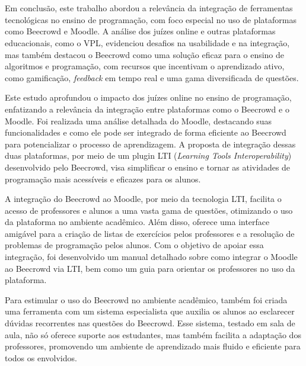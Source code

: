 

\chapter{}

Em conclusão, este trabalho abordou a relevância da integração de ferramentas tecnológicas no ensino de programação, com foco especial no uso de plataformas como Beecrowd e Moodle. A análise dos juízes online e outras plataformas educacionais, como o VPL, evidenciou desafios na usabilidade e na integração, mas também destacou o Beecrowd como uma solução eficaz para o ensino de algoritmos e programação, com recursos que incentivam o aprendizado ativo, como gamificação, \textit{feedback} em tempo real e uma gama diversificada de questões.

Este estudo aprofundou o impacto dos juízes online no ensino de programação, enfatizando a relevância da integração entre plataformas como o Beecrowd e o Moodle. Foi realizada uma análise detalhada do Moodle, destacando suas funcionalidades e como ele pode ser integrado de forma eficiente ao Beecrowd para potencializar o processo de aprendizagem. A proposta de integração dessas duas plataformas, por meio de um plugin LTI (\textit{Learning Tools Interoperability}) desenvolvido pelo Beecrowd, visa simplificar o ensino e tornar as atividades de programação mais acessíveis e eficazes para os alunos.

A integração do Beecrowd ao Moodle, por meio da tecnologia LTI, facilita o acesso de professores e alunos a uma vasta gama de questões, otimizando o uso da plataforma no ambiente acadêmico. Além disso, oferece uma interface amigável para a criação de listas de exercícios pelos professores e a resolução de problemas de programação pelos alunos. Com o objetivo de apoiar essa integração, foi desenvolvido um manual detalhado sobre como integrar o Moodle ao Beecrowd via LTI, bem como um guia para orientar os professores no uso da plataforma.

Para estimular o uso do Beecrowd no ambiente acadêmico, também foi criada uma ferramenta com um sistema especialista que auxilia os alunos ao esclarecer dúvidas recorrentes nas questões do Beecrowd. Esse sistema, testado em sala de aula, não só oferece suporte aos estudantes, mas também facilita a adaptação dos professores, promovendo um ambiente de aprendizado mais fluido e eficiente para todos os envolvidos.

